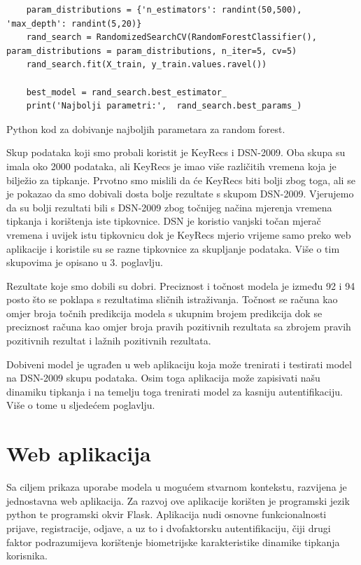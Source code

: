 \documentclass[]{foi}
\begin{document}
\begin{listing}
\begin{verbatim}
    param_distributions = {'n_estimators': randint(50,500), 'max_depth': randint(5,20)}
    rand_search = RandomizedSearchCV(RandomForestClassifier(), param_distributions = param_distributions, n_iter=5, cv=5)
    rand_search.fit(X_train, y_train.values.ravel())

    best_model = rand_search.best_estimator_
    print('Najbolji parametri:',  rand_search.best_params_)
\end{verbatim}
\caption{Python kod za dobivanje najboljih parametara za random forest.}
\label{lst:python_para}
\end{listing}

Skup podataka koji smo probali koristit je KeyRecs i DSN-2009. Oba skupa su imala oko 2000 podataka, ali KeyRecs je imao više različitih vremena koja je bilježio za tipkanje. Prvotno smo mislili da će KeyRecs biti bolji zbog toga, ali se je pokazao da smo dobivali dosta bolje rezultate s skupom DSN-2009. Vjerujemo da su bolji rezultati bili s DSN-2009 zbog točnijeg načina mjerenja vremena tipkanja i korištenja iste tipkovnice. DSN je koristio vanjski točan mjerač vremena i uvijek istu tipkovnicu dok je KeyRecs mjerio vrijeme samo preko web aplikacije i koristile su se razne tipkovnice za skupljanje podataka. Više o tim skupovima je opisano u 3. poglavlju.

Rezultate koje smo dobili su dobri. Preciznost i točnost modela je između 92 i 94 posto što se poklapa s rezultatima sličnih istraživanja. Točnost se računa kao omjer broja točnih predikcija modela s ukupnim brojem predikcija dok se preciznost računa kao omjer broja pravih pozitivnih rezultata sa zbrojem pravih pozitivnih rezultat i lažnih pozitivnih rezultata.

Dobiveni model je ugrađen u web aplikaciju koja može trenirati i testirati model na DSN-2009 skupu podataka. Osim toga aplikacija može zapisivati našu dinamiku tipkanja i na temelju toga trenirati model za kasniju autentifikaciju. Više o tome u sljedećem poglavlju.



\chapter{Web aplikacija}
Sa ciljem prikaza uporabe modela u mogućem stvarnom kontekstu, razvijena je jednostavna web aplikacija. Za razvoj ove aplikacije korišten je programski jezik python te programski okvir Flask. Aplikacija nudi osnovne funkcionalnosti prijave, registracije, odjave, a uz to i dvofaktorsku autentifikaciju, čiji drugi faktor podrazumijeva korištenje biometrijske karakteristike dinamike tipkanja korisnika. 
\end{document}
